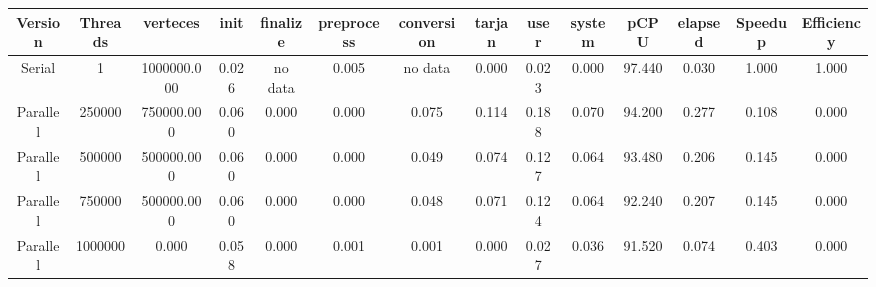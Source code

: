 \begin{tabular}{|c|c|c|c|c|c|c|c|c|c|c|c|c|c|}
\toprule
 Version &  Threads &    verteces &  init & finalize &  preprocess & conversion &  tarjan &  user &  system &   pCPU &  elapsed &  Speedup &  Efficiency \\
\midrule
  Serial &        1 & 1000000.000 & 0.026 &  no data &       0.005 &    no data &   0.000 & 0.023 &   0.000 & 97.440 &    0.030 &    1.000 &       1.000 \\
Parallel &   250000 &  750000.000 & 0.060 &    0.000 &       0.000 &      0.075 &   0.114 & 0.188 &   0.070 & 94.200 &    0.277 &    0.108 &       0.000 \\
Parallel &   500000 &  500000.000 & 0.060 &    0.000 &       0.000 &      0.049 &   0.074 & 0.127 &   0.064 & 93.480 &    0.206 &    0.145 &       0.000 \\
Parallel &   750000 &  500000.000 & 0.060 &    0.000 &       0.000 &      0.048 &   0.071 & 0.124 &   0.064 & 92.240 &    0.207 &    0.145 &       0.000 \\
Parallel &  1000000 &       0.000 & 0.058 &    0.000 &       0.001 &      0.001 &   0.000 & 0.027 &   0.036 & 91.520 &    0.074 &    0.403 &       0.000 \\
\bottomrule
\end{tabular}
